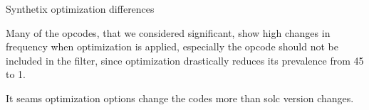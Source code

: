 \documentclass[../main.tex]{subfiles}
\begin{document}
\begin{table}[ht!]
  \centering
  \scriptsize
  \caption{Synthetix optimization differences}
  \label{tbl:opt_diff}
\end{table}

Many of the opcodes, that we considered significant, show high changes in frequency when optimization is applied, especially the  opcode should not be included in the filter, since optimization drastically reduces its prevalence from 45 to 1.

It seams optimization options change the codes more than solc version changes.
\end{document}
